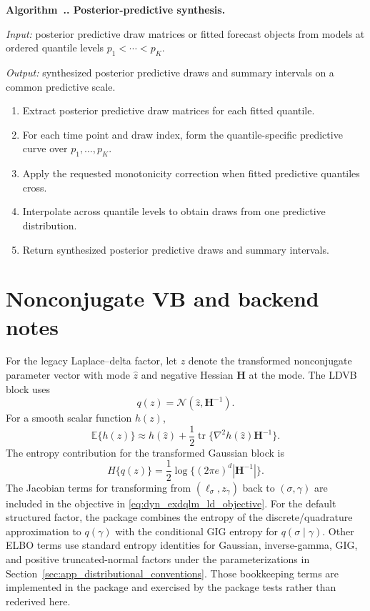 \documentclass{jss}
\newcommand{\mat}[1]{\mathbf{#1}}
\newcommand{\N}{\mathcal{N}}
\renewcommand{\E}{\mathbb{E}}
\newcommand{\tr}{\operatorname{tr}}
\newcounter{appalgorithm}
\renewcommand{\theappalgorithm}{\thesection.\arabic{appalgorithm}}
\newenvironment{appalgorithm}[1]{%
  \refstepcounter{appalgorithm}%
  \par\medskip\noindent\textbf{Algorithm~\theappalgorithm. #1.}\par\nobreak
}{\par\medskip}
\begin{document}
\begin{appalgorithm}{Posterior-predictive synthesis}
\label{alg:predictive-synthesis}
\par\noindent\emph{Input:} posterior predictive draw matrices or fitted
forecast objects from models at ordered quantile levels
$p_1<\cdots<p_K$.
\par\noindent\emph{Output:} synthesized posterior predictive draws and
summary intervals on a common predictive scale.
\begin{enumerate}[label=(\arabic*)]
\item Extract posterior predictive draw matrices for each fitted quantile.
\item For each time point and draw index, form the quantile-specific
predictive curve over $p_1,\ldots,p_K$.
\item Apply the requested monotonicity correction when fitted predictive
quantiles cross.
\item Interpolate across quantile levels to obtain draws from one predictive
distribution.
\item Return synthesized posterior predictive draws and summary intervals.
\end{enumerate}
\end{appalgorithm}

\section{Nonconjugate VB and backend notes}
\label{sec:numerical_blocks}

For the legacy Laplace--delta factor, let $z$ denote the transformed
nonconjugate parameter vector with mode
$\hat z$ and negative Hessian $\mat{H}$ at the mode. The LDVB block uses
\begin{equation}
q(z)=\N(\hat z,\mat{H}^{-1}).
\label{eq:ld_gaussian}
\end{equation}
For a smooth scalar function $h(z)$,
\begin{equation}
\E\{h(z)\}
\approx
h(\hat z)
+\frac{1}{2}\tr\{\nabla^2h(\hat z)\mat{H}^{-1}\}.
\label{eq:delta_generic}
\end{equation}
The entropy contribution for the transformed Gaussian block is
\begin{equation}
H\{q(z)\}
=
\frac{1}{2}\log\{(2\pi e)^d|\mat{H}^{-1}|\}.
\label{eq:entropy_ld}
\end{equation}
The Jacobian terms for transforming from $(\ell_\sigma,z_\gamma)$ back to
$(\sigma,\gamma)$ are included in the objective in
\eqref{eq:dyn_exdqlm_ld_objective}. For the default structured factor, the
package combines the entropy of the discrete/quadrature approximation to
\(q(\gamma)\) with the conditional GIG entropy for
\(q(\sigma\mid\gamma)\). Other ELBO terms use standard entropy identities for
Gaussian, inverse-gamma, GIG, and positive truncated-normal factors under the
parameterizations in
Section~\ref{sec:app_distributional_conventions}. Those bookkeeping terms are
implemented in the package and exercised by the package tests rather than
rederived here.
\end{document}
